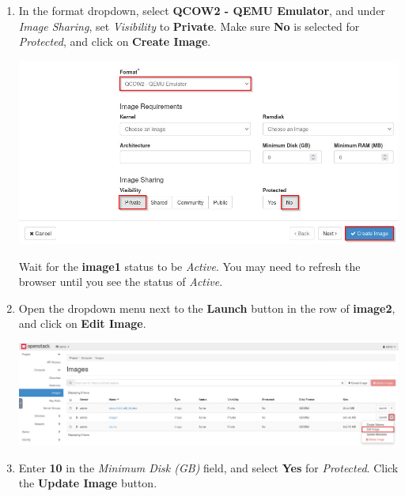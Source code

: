 \documentclass[letterpaper, 12pt]{article}
\begin{document}
\begin{enumerate}
    \item In the format dropdown, select \textbf{QCOW2 - QEMU Emulator}, and under \textit{Image Sharing}, set
    \textit{Visibility} to \textbf{Private}. Make sure \textbf{No} is selected for \textit{Protected}, and click on
    \textbf{Create Image}.

    \begin{center}
        \includegraphics[width=\linewidth]{images/part1/step6.png}
    \end{center}

    \begin{stopbox}{}
        Wait for the \textbf{image1} status to be \textit{Active}. You may need to refresh the browser until you see the
        status of \textit{Active}.
    \end{stopbox}

    \item Open the dropdown menu next to the \textbf{Launch} button in the row of \textbf{image2}, and click on
    \textbf{Edit Image}.

    \begin{center}
        \includegraphics[width=\linewidth]{images/part1/step7.png}
    \end{center}

    \item Enter \textbf{10} in the \textit{Minimum Disk (GB)} field, and select \textbf{Yes} for \textit{Protected}.
    Click the \textbf{Update Image} button.


\end{enumerate}
\end{document}
